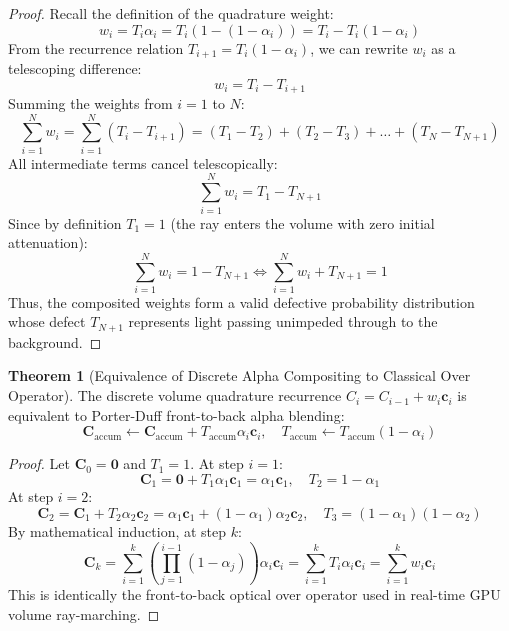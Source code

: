 \documentclass[11pt,a4paper]{article}
\theoremstyle{definition}
\newtheorem{theorem}{\textbf{Theorem}}[section]
\begin{document}
\begin{proof}
Recall the definition of the quadrature weight:
{\boldmath
\begin{equation}
w_i = T_i \alpha_i = T_i (1 - (1 - \alpha_i)) = T_i - T_i(1 - \alpha_i)
\end{equation}
}
From the recurrence relation $T_{i+1} = T_i (1 - \alpha_i)$, we can rewrite $w_i$ as a telescoping difference:
{\boldmath
\begin{equation}
w_i = T_i - T_{i+1}
\end{equation}
}
Summing the weights from $i = 1$ to $N$:
{\boldmath
\begin{equation}
\sum_{i=1}^N w_i = \sum_{i=1}^N (T_i - T_{i+1}) = (T_1 - T_2) + (T_2 - T_3) + \dots + (T_N - T_{N+1})
\end{equation}
}
All intermediate terms cancel telescopically:
{\boldmath
\begin{equation}
\sum_{i=1}^N w_i = T_1 - T_{N+1}
\end{equation}
}
Since by definition $T_1 = 1$ (the ray enters the volume with zero initial attenuation):
{\boldmath
\begin{equation}
\sum_{i=1}^N w_i = 1 - T_{N+1} \iff \sum_{i=1}^N w_i + T_{N+1} = 1
\end{equation}
}
Thus, the composited weights form a valid defective probability distribution whose defect $T_{N+1}$ represents light passing unimpeded through to the background.
\end{proof}

\begin{theorem}[Equivalence of Discrete Alpha Compositing to Classical Over Operator]
The discrete volume quadrature recurrence $C_i = C_{i-1} + w_i \mathbf{c}_i$ is equivalent to Porter-Duff front-to-back alpha blending:
{\boldmath
\begin{equation}
\mathbf{C}_{\text{accum}} \gets \mathbf{C}_{\text{accum}} + T_{\text{accum}} \alpha_i \mathbf{c}_i, \quad T_{\text{accum}} \gets T_{\text{accum}}(1 - \alpha_i)
\end{equation}
}
\end{theorem}

\begin{proof}
Let $\mathbf{C}_0 = \mathbf{0}$ and $T_1 = 1$.
At step $i = 1$:
{\boldmath
\begin{equation}
\mathbf{C}_1 = \mathbf{0} + T_1 \alpha_1 \mathbf{c}_1 = \alpha_1 \mathbf{c}_1, \quad T_2 = 1 - \alpha_1
\end{equation}
}
At step $i = 2$:
{\boldmath
\begin{equation}
\mathbf{C}_2 = \mathbf{C}_1 + T_2 \alpha_2 \mathbf{c}_2 = \alpha_1 \mathbf{c}_1 + (1 - \alpha_1)\alpha_2 \mathbf{c}_2, \quad T_3 = (1 - \alpha_1)(1 - \alpha_2)
\end{equation}
}
By mathematical induction, at step $k$:
{\boldmath
\begin{equation}
\mathbf{C}_k = \sum_{i=1}^k \left( \prod_{j=1}^{i-1} (1 - \alpha_j) \right) \alpha_i \mathbf{c}_i = \sum_{i=1}^k T_i \alpha_i \mathbf{c}_i = \sum_{i=1}^k w_i \mathbf{c}_i
\end{equation}
}
This is identically the front-to-back optical over operator used in real-time GPU volume ray-marching.
\end{proof}
\end{document}
